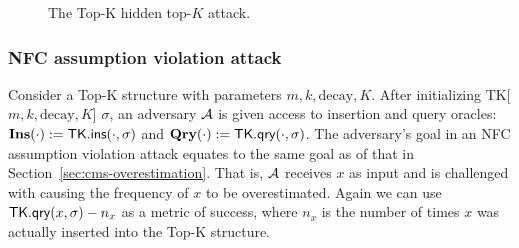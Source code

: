 \begin{figure}[h]
    \centering
    \begin{pcvstack}
    \end{pcvstack}
	\caption[Redis TK Hidden Top-$K$ Hiding Attack.]{The Top-K hidden top-$K$ attack.}
    \label{fig:tk-hidden-attack} 
\end{figure}


\subsubsection{NFC assumption violation attack}

Consider a Top-K structure with parameters $m, k, \mathrm{decay}, K$. After initializing TK[$m, k, \mathrm{decay}, K$] $\sigma$, an adversary $\mathcal{A}$ is given access to insertion and query oracles: $\textbf{Ins}(\cdot) := \textsf{TK}.\textsf{ins}(\cdot, \sigma)$ and $\textbf{Qry}(\cdot) := \textsf{TK}.\textsf{qry}(\cdot, \sigma)$. The adversary's goal in an NFC assumption violation attack equates to the same goal as of that in Section~\ref{sec:cms-overestimation}. That is, $\mathcal{A}$ receives $x$ as input and is challenged with causing the frequency of $x$ to be overestimated. Again we can use $\textsf{TK}.\textsf{qry}(x, \sigma) - n_x$ as a metric of success, where $n_x$ is the number of times $x$ was actually inserted into the Top-K structure.


